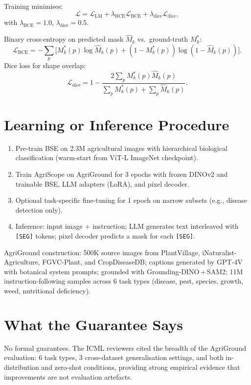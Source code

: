 \documentclass[10pt,twocolumn]{article}
\begin{document}
Training minimises:
\[
\mathcal{L} = \mathcal{L}_{\text{LM}}
            + \lambda_{\text{BCE}}\mathcal{L}_{\text{BCE}}
            + \lambda_{\text{dice}}\mathcal{L}_{\text{dice}},
\]
with $\lambda_{\text{BCE}}=1.0$, $\lambda_{\text{dice}}=0.5$.

Binary cross-entropy on predicted mask $\hat{M}_k$ vs.\ ground-truth $M_k^*$:
\[
\mathcal{L}_{\text{BCE}} = -\sum_p
  \bigl[M_k^*(p)\log\hat{M}_k(p)
  + (1{-}M_k^*(p))\log(1{-}\hat{M}_k(p))\bigr].
\]
Dice loss for shape overlap:
\[
\mathcal{L}_{\text{dice}} = 1 -
  \frac{2\sum_p M_k^*(p)\hat{M}_k(p)}
       {\sum_p M_k^*(p) + \sum_p \hat{M}_k(p)}.
\]

\section{Learning or Inference Procedure}

\begin{enumerate}[itemsep=2pt,parsep=0pt]
  \item Pre-train BSE on 2.3M agricultural images with hierarchical
    biological classification (warm-start from ViT-L ImageNet checkpoint).
  \item Train AgriScope on AgriGround for 3 epochs with frozen DINOv2
    and trainable BSE, LLM adapters (LoRA), and pixel decoder.
  \item Optional task-specific fine-tuning for 1 epoch on narrow
    subsets (e.g., disease detection only).
  \item Inference: input image + instruction; LLM generates text
    interleaved with \texttt{[SEG]} tokens; pixel decoder predicts
    a mask for each \texttt{[SEG]}.
\end{enumerate}

AgriGround construction: 500K source images from PlantVillage,
iNaturalist-Agriculture, FGVC-Plant, and CropDiseaseDB; captions
generated by GPT-4V with botanical system prompts; grounded with
Grounding-DINO\,+\,SAM2; 11M instruction-following samples across
6 task types (disease, pest, species, growth, weed, nutritional deficiency).

\section{What the Guarantee Says}

No formal guarantees. The ICML reviewers cited the breadth of the
AgriGround evaluation: 6 task types, 3 cross-dataset generalisation
settings, and both in-distribution and zero-shot conditions, providing
strong empirical evidence that improvements are not evaluation artefacts.
\end{document}
